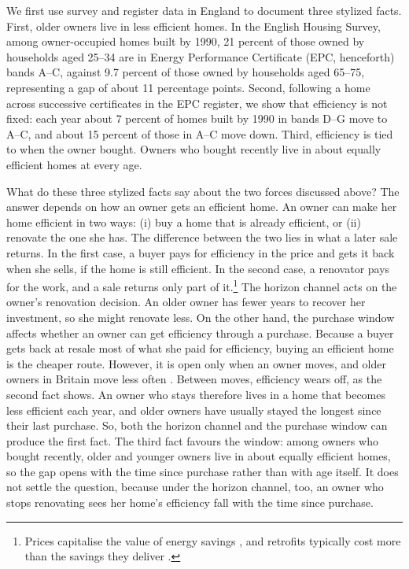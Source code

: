 We first use survey and register data in England to document three stylized facts. First, older owners live in less efficient homes. In the English Housing
Survey, among owner-occupied homes built by 1990, 21 percent of those
owned by households aged 25--34 are in Energy Performance Certificate (EPC, henceforth) bands
A--C, against 9.7 percent of those owned by households aged 65--75, representing a gap of about 11 percentage points.  Second,  following a home across successive certificates in the
EPC register, we show that  efficiency is not fixed: each year about 7
percent of homes built by 1990 in bands D--G move to A--C, and about 15 percent
of those in A--C move down. Third, efficiency is tied to when the
owner bought. Owners who bought recently live in about equally
efficient homes at every age.




 What do these three stylized facts say about the two forces discussed above? The answer depends on
how an owner gets an efficient home. An owner can make her home efficient in two ways: (i) buy a home that is
already efficient, or (ii) renovate the one she has. The difference between the two lies in what a
later sale returns. In the first case, a buyer pays for efficiency in the price and gets it
back when she sells, if the home is still efficient. In the second case,   a renovator pays for the work, and a sale  returns only
part of it.\footnote{Prices capitalise the value of energy savings
\citep{myers2019home,aydin2020capitalization,fuerst2015energy}, and
retrofits typically cost more than the savings they deliver
\citep{fowlie2018weatherization}.}  The horizon channel acts on  the owner's renovation decision. An older owner has fewer years to recover her investment, so
she might renovate less. On the other hand,  the purchase window affects whether an
owner can get efficiency through a purchase. Because a buyer gets back at resale most of what she paid for
efficiency, buying an efficient home is the cheaper route. However, it is open
only when an owner moves, and older owners in Britain move less often
\citep{banks2012housing}. Between moves, efficiency wears off, as the
second fact shows. An owner who stays therefore lives in a home that
becomes less efficient each year, and older owners have usually stayed the
longest since their last purchase. So, both the horizon channel and the purchase window
can produce the first fact.  The third fact favours the window: among owners who bought
recently, older and younger owners live in about equally efficient homes,
so the gap opens with the time since purchase rather than with age itself.
It does not settle the question, because under the horizon channel, too,
an owner who stops renovating sees her home's efficiency fall with the
time since purchase.




